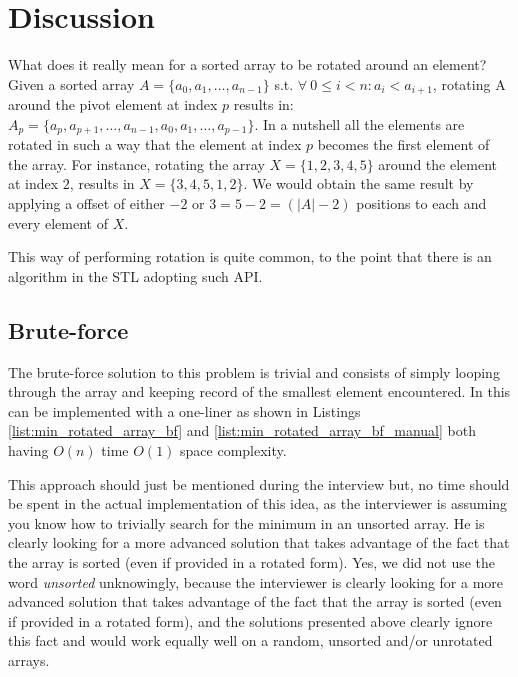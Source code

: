 \section{Discussion}
\label{min_rotated_array:sec:discussion}
What does it really mean for a sorted array to be rotated around an element? Given a sorted array $A=\{a_0, a_1, \ldots,a_{n-1}\}$ s.t. $ \forall \: 0 \leq i < n: a_i < a_{i+1}$, rotating A around the pivot element at index $p$ results in: $A_p=\{a_p, a_{p+1}, \ldots,a_{n-1}, a_0, a_1, \ldots, a_{p-1}\}$. In a nutshell all the elements are rotated in such a way that the element at index $p$ becomes the first element of the array. For instance, rotating the array $X=\{1,2,3,4,5\}$ around the element at index $2$, results in $X=\{3,4,5,1,2\}$. We would obtain the same result by applying a offset of either $-2$ or $3=5-2=(|A|-2)$ positions to each and every element of $X$. 

This way of performing rotation is quite common, to the point that there is an algorithm in the \CC STL\cite{cit::std::rotate} adopting such API.

\subsection{Brute-force}
\label{min_rotated_array:sec:bruteforce}
The brute-force solution to this problem is trivial and consists of simply looping through the array and keeping record of the smallest element encountered.
In \CC this can be implemented with a one-liner as shown in Listings \ref{list:min_rotated_array_bf} and \ref{list:min_rotated_array_bf_manual} both having $O(n)$ time $O(1)$ space complexity.





This approach should just be mentioned during the interview but, no time should be spent in the actual implementation of this idea, as the interviewer is assuming you know how to trivially search for the minimum in an unsorted array. He is clearly looking for a more advanced solution that takes advantage of the fact that the array is sorted (even if provided in a rotated form).
Yes, we did not use the word \textit{unsorted} unknowingly, because the interviewer is clearly looking for a more advanced solution that takes advantage of the fact that the array is sorted (even if provided in a rotated form), and the solutions presented above clearly ignore this fact and would work equally well on a random, unsorted and/or unrotated arrays.


